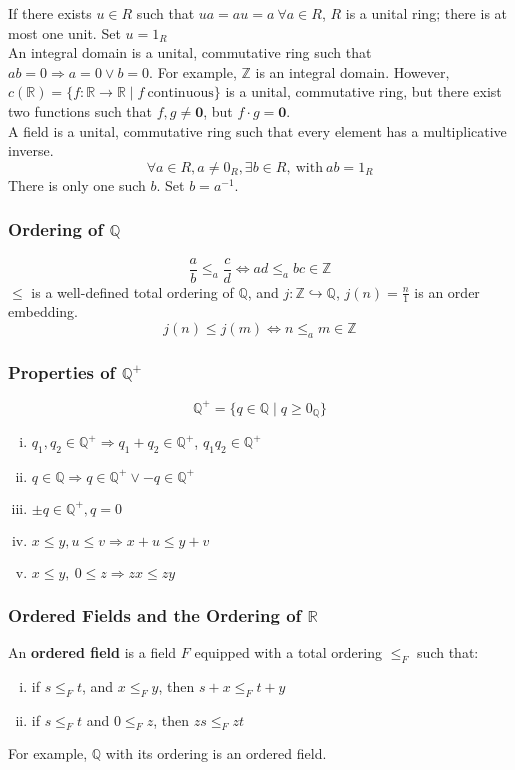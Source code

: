 \documentclass[10pt]{extarticle}
\renewcommand{\mathbf}[1]{\mathbold{#1}}
\newcommand{\Q}{\mathbb{Q}}
\newcommand{\Z}{\mathbb{Z}}
\newcommand{\R}{\mathbb{R}}
\begin{document}
        If there exists $u\in R$ such that $ua = au = a~\forall a\in R$, $R$ is a unital ring; there is at most one unit. Set $u = 1_R$\\

        An integral domain is a unital, commutative ring such that $ab = 0 \Rightarrow a=0\vee b=0$. For example, $\Z$ is an integral domain. However, $c(\R) = \{f:\R \rightarrow \R\mid f~\text{continuous}\}$ is a unital, commutative ring, but there exist two functions such that $f,g\neq \mathbf{0}$, but $f\cdot g = \mathbf{0}$.\\

        A field is a unital, commutative ring such that every element has a multiplicative inverse.
        \[
          \forall a\in R, a\neq 0_R,\exists b\in R,~\text{with}~ab = 1_R
        \] 
        There is only one such $b$. Set $b = a^{-1}$.
    \subsubsection{Ordering of $\Q$}%
    \[
      \frac{a}{b} \leq_a \frac{c}{d} \Leftrightarrow ad\leq_{a} bc \in \Z
    \] 
      $\leq$ is a well-defined total ordering of $\Q$, and $j: \Z\hookrightarrow \Q$, $j(n) = \frac{n}{1}$ is an order embedding.
      \[
        j(n) \leq j(m) \Leftrightarrow n\leq_a m\in \Z
      \] 
    \subsubsection{Properties of $\Q^+$}%
      \[
        \Q^+ = \{q \in \Q \mid q \geq 0_{\Q}\}
      \] 
      \begin{enumerate}[(i)]
        \item $q_1,q_2\in \Q^+ \Rightarrow q_1 + q_2 \in \Q^+$, $q_1q_2 \in \Q^+$
        \item $q\in \Q \Rightarrow q\in \Q^+ \vee -q\in \Q^+$
        \item $\pm q\in \Q^+,q = 0$
        \item $x\leq y,u\leq v \Rightarrow x+u \leq y+v$
        \item $x\leq y,~0\leq z \Rightarrow zx \leq zy$
      \end{enumerate}
    \subsubsection{Ordered Fields and the Ordering of $\R$}%
    An \textbf{ordered field} is a field $F$ equipped with a total ordering $\leq_{F}$ such that:
    \begin{enumerate}[(i)]
      \item if $s\leq_{F} t$, and $x\leq_{F} y$, then $s + x \leq_{F} t + y$
      \item if $s\leq_{F} t$ and $0\leq_{F} z$, then $zs\leq_{F} zt$
    \end{enumerate}
    For example, $\Q$ with its ordering is an ordered field.\\
\end{document}
